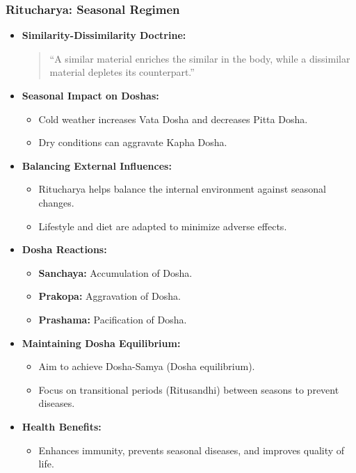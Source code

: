 \begin{frame}[fragile]\frametitle{Ritucharya: Seasonal Regimen}

      \begin{itemize}
        \item \textbf{Similarity-Dissimilarity Doctrine:} 
        \begin{quote}
        “A similar material enriches the similar in the body, while a dissimilar material depletes its counterpart.”
        \end{quote}
        \item \textbf{Seasonal Impact on Doshas:} 
        \begin{itemize}
            \item Cold weather increases Vata Dosha and decreases Pitta Dosha.
            \item Dry conditions can aggravate Kapha Dosha.
        \end{itemize}
        \item \textbf{Balancing External Influences:} 
        \begin{itemize}
            \item Ritucharya helps balance the internal environment against seasonal changes.
            \item Lifestyle and diet are adapted to minimize adverse effects.
        \end{itemize}
        \item \textbf{Dosha Reactions:} 
        \begin{itemize}
            \item \textbf{Sanchaya:} Accumulation of Dosha.
            \item \textbf{Prakopa:} Aggravation of Dosha.
            \item \textbf{Prashama:} Pacification of Dosha.
        \end{itemize}
        \item \textbf{Maintaining Dosha Equilibrium:} 
        \begin{itemize}
            \item Aim to achieve Dosha-Samya (Dosha equilibrium).
            \item Focus on transitional periods (Ritusandhi) between seasons to prevent diseases.
        \end{itemize}
        \item \textbf{Health Benefits:} 
        \begin{itemize}
            \item Enhances immunity, prevents seasonal diseases, and improves quality of life.
        \end{itemize}
      \end{itemize}

\end{frame}

